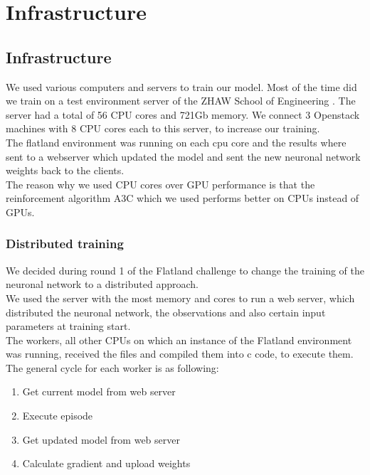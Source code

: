 \chapter{Infrastructure}\label{chap.infrastruktur}

\section{Infrastructure}\label{infrastructure}
We used various computers and servers to train our model. Most of the time did we train on a test environment server of the ZHAW School of Engineering \cite{zhaw}.
The server had a total of 56 CPU cores and 721Gb memory. We connect 3 Openstack machines with 8 CPU cores each to this server, to increase our training. \\
The flatland environment was running on each cpu core and the results where sent to a webserver which updated the model and sent the new neuronal network weights back to the clients. \\
The reason why we used CPU cores over GPU performance is that the reinforcement algorithm A3C which we used performs better on CPUs instead of GPUs. \\


\subsection{Distributed training}
We decided during round 1 of the Flatland challenge to change the training of the neuronal network to a distributed approach. \\
We used the server with the most memory and cores to run a web server, which distributed the neuronal network, the observations and also certain input parameters at training start. \\
The workers, all other CPUs on which an instance of the Flatland environment was running, received the files and compiled them into c code, to execute them.\\
The general cycle for each worker is as following:
\begin{enumerate}
    \item Get current model from web server
    \item Execute episode
    \item Get updated model from web server
    \item Calculate gradient and upload weights
\end{enumerate}


